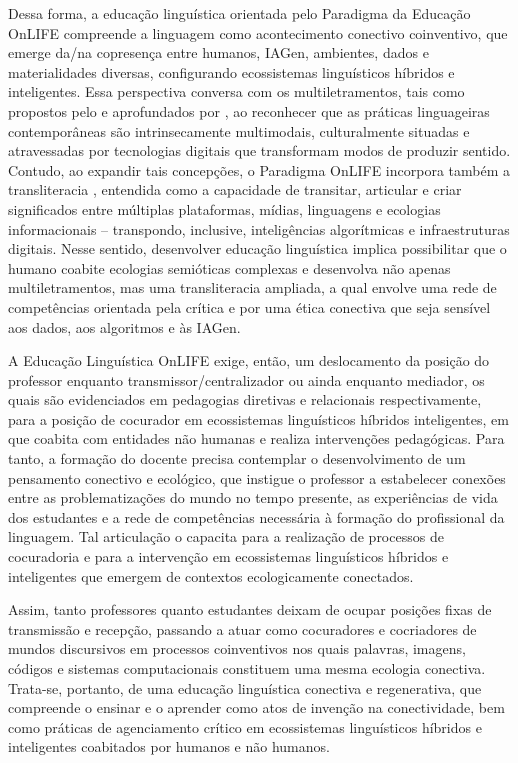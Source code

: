 \documentclass[portuguese]{textolivre}
\begin{document}
Dessa forma, a educação linguística orientada pelo Paradigma da Educação OnLIFE compreende a linguagem como acontecimento conectivo coinventivo, que emerge da/na copresença entre humanos, IAGen, ambientes, dados e materialidades diversas, configurando ecossistemas linguísticos híbridos e inteligentes. Essa perspectiva conversa com os multiletramentos, tais como propostos pelo \textcite{newlondongroup1996pedagogy} e aprofundados por \textcite{cope2000multiliteracies,cope2009multiliteracies}, ao reconhecer que as práticas linguageiras contemporâneas são intrinsecamente multimodais, culturalmente situadas e atravessadas por tecnologias digitais que transformam modos de produzir sentido. Contudo, ao expandir tais concepções, o Paradigma OnLIFE incorpora também a transliteracia \cite{thomas2007crossingdivides,ipri2010transliteracy}, entendida como a capacidade de transitar, articular e criar significados entre múltiplas plataformas, mídias, linguagens e ecologias informacionais – transpondo, inclusive, inteligências algorítmicas e infraestruturas digitais. Nesse sentido, desenvolver educação linguística implica possibilitar que o humano coabite ecologias semióticas complexas e desenvolva não apenas multiletramentos, mas uma transliteracia ampliada, a qual envolve uma rede de competências orientada pela crítica e por uma ética conectiva que seja sensível aos dados, aos algoritmos e às IAGen.

A Educação Linguística OnLIFE exige, então, um deslocamento da posição do professor enquanto transmissor/centralizador ou ainda enquanto mediador, os quais são evidenciados em pedagogias diretivas e relacionais respectivamente, para a posição de cocurador em ecossistemas linguísticos híbridos inteligentes, em que coabita com entidades não humanas e realiza intervenções pedagógicas. Para tanto, a formação do docente precisa contemplar o desenvolvimento de um pensamento conectivo e ecológico, que instigue o professor a estabelecer conexões entre as problematizações do mundo no tempo presente, as experiências de vida dos estudantes e a rede de competências necessária à formação do profissional da linguagem. Tal articulação o capacita para a realização de processos de cocuradoria e para a intervenção em ecossistemas linguísticos híbridos e inteligentes que emergem de contextos ecologicamente conectados. 

Assim, tanto professores quanto estudantes deixam de ocupar posições fixas de transmissão e recepção, passando a atuar como cocuradores e cocriadores de mundos discursivos em processos coinventivos nos quais palavras, imagens, códigos e sistemas computacionais constituem uma mesma ecologia conectiva. Trata-se, portanto, de uma educação linguística conectiva e regenerativa, que compreende o ensinar e o aprender como atos de invenção na conectividade, bem como práticas de agenciamento crítico em ecossistemas linguísticos híbridos e inteligentes coabitados por humanos e não humanos.
\end{document}
